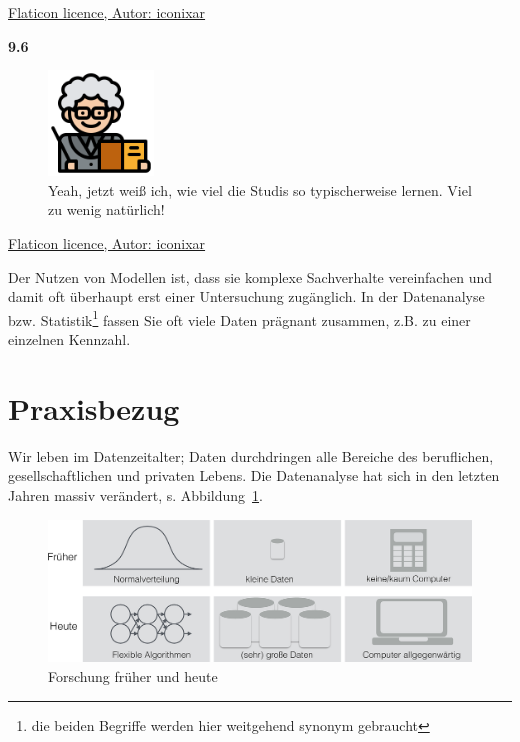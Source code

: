 \documentclass[
  a4paper,
  DIV=11]{scrreprt}
\theoremstyle{definition}
\theoremstyle{definition}
\theoremstyle{remark}
\begin{document}
\href{https://www.flaticon.com/free-icons/professor\%22}{Flaticon
licence, Autor: iconixar}

\textbf{9.6}

\begin{figure}

{\centering \includegraphics[width=0.25\textwidth,height=\textheight]{./img/teacher.png}

}

\caption{Yeah, jetzt weiß ich, wie viel die Studis so typischerweise
lernen. Viel zu wenig natürlich!}

\end{figure}

\href{https://www.flaticon.com/free-icons/professor\%22}{Flaticon
licence, Autor: iconixar}

Der Nutzen von Modellen ist, dass sie komplexe Sachverhalte vereinfachen
und damit oft überhaupt erst einer Untersuchung zugänglich. In der
Datenanalyse bzw. Statistik\footnote{die beiden Begriffe werden hier
  weitgehend synonym gebraucht} fassen Sie oft viele Daten prägnant
zusammen, z.B. zu einer einzelnen Kennzahl.

\hypertarget{praxisbezug}{%
\section{Praxisbezug}\label{praxisbezug}}

Wir leben im Datenzeitalter; Daten durchdringen alle Bereiche des
beruflichen, gesellschaftlichen und privaten Lebens. Die Datenanalyse
hat sich in den letzten Jahren massiv verändert, s.
Abbildung~\ref{fig-fo-früher-heute}.

\begin{figure}

{\centering \includegraphics{./img/Forschung_frueher_heute-crop.png}

}

\caption{\label{fig-fo-früher-heute}Forschung früher und heute}

\end{figure}
\end{document}
